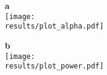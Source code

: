 \documentclass{article}
\begin{document}
\newcommand{\results}{../../simulations}

\begin{figure}[bt]
\begin{minipage}{0.48\textwidth}
    {\Large \textbf{\textsf{a}}} \\
\texttt{[image: \\results/plot\_alpha.pdf]}
\end{minipage}
\begin{minipage}{0.48\textwidth}
    {\Large \textbf{\textsf{b}}} \\
\texttt{[image: \\results/plot\_power.pdf]}
\end{minipage}
\end{figure}
\end{document}
